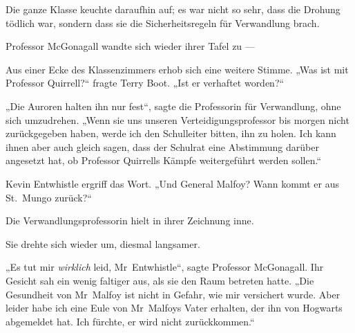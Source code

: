 Die ganze Klasse keuchte daraufhin auf; es war nicht so sehr, dass die Drohung tödlich war, sondern dass sie die Sicherheitsregeln für Verwandlung brach.

Professor McGonagall wandte sich wieder ihrer Tafel zu —

Aus einer Ecke des Klassenzimmers erhob sich eine weitere Stimme.
„Was ist mit Professor Quirrell?“ fragte Terry Boot.
„Ist er verhaftet worden?“

„Die Auroren halten ihn nur fest“, sagte die Professorin für Verwandlung, ohne sich umzudrehen.
„Wenn sie uns unseren Verteidigungsprofessor bis morgen nicht zurückgegeben haben, werde ich den Schulleiter bitten, ihn zu holen. Ich kann ihnen aber auch gleich sagen, dass der Schulrat eine Abstimmung darüber angesetzt hat, ob Professor Quirrells Kämpfe weitergeführt werden sollen.“

Kevin Entwhistle ergriff das Wort.
„Und General Malfoy? Wann kommt er aus St.~Mungo zurück?“

Die Verwandlungsprofessorin hielt in ihrer Zeichnung inne.

Sie drehte sich wieder um, diesmal langsamer.

„Es tut mir \emph{wirklich} leid, Mr~Entwhistle“, sagte Professor McGonagall. Ihr Gesicht sah ein wenig faltiger aus, als sie den Raum betreten hatte.
„Die Gesundheit von Mr~Malfoy ist nicht in Gefahr, wie mir versichert wurde. Aber leider habe ich eine Eule von Mr~Malfoys Vater erhalten, der ihn von Hogwarts abgemeldet hat. Ich fürchte, er wird nicht zurückkommen.“
